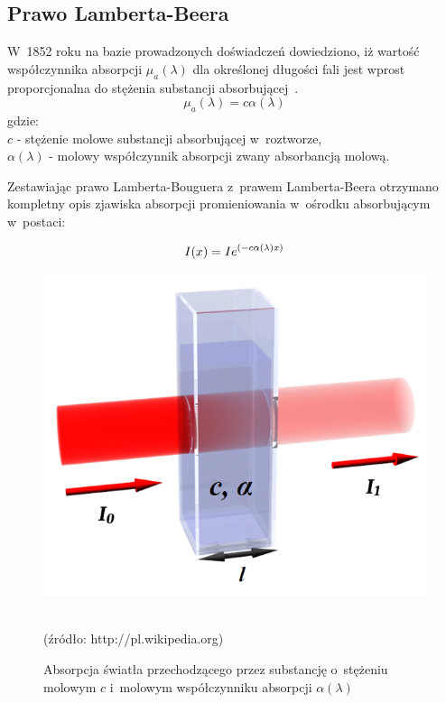 \subsection{Prawo Lamberta-Beera}
\label{subsec:BeerLambert}

W~1852 roku na bazie prowadzonych doświadczeń dowiedziono, iż wartość współczynnika absorpcji $\mu_{a}(\lambda)$ dla określonej długości fali jest wprost 
proporcjonalna do stężenia substancji absorbującej~\cite{Yavari:PhD:2006}.\\

\begin{equation}
	\mu_{a}(\lambda) = c\alpha(\lambda)
\end{equation}
gdzie:\\
$c$ - stężenie molowe substancji absorbującej w~roztworze,\\
$\alpha(\lambda)$ - molowy współczynnik absorpcji zwany absorbancją molową.

\noindent Zestawiając prawo Lamberta-Bouguera z~prawem Lamberta-Beera otrzymano kompletny opis zjawiska absorpcji promieniowania w~ośrodku absorbującym w~postaci:

\begin{equation}
	I(x) = Ie^{(-c\alpha(\lambda) x)}\\
\end{equation}
 
\begin{figure}[ht]
	\centerline{\includegraphics[scale = 0.44]{graphic/Beer_lambert.png}}
	\caption{Absorpcja światła przechodzącego przez substancję o~stężeniu molowym $c$ i~molowym współczynniku absorpcji $\alpha(\lambda)$}
	~\\
	(źródło: http://pl.wikipedia.org)
	\label{rys:Beer_lambert}
\end{figure}


